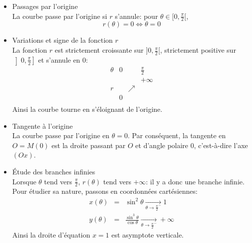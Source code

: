 {\begin{enumerate}
{\begin{itemize}
On se restreint donc dans la suite à $\theta\in[0,\frac{\pi}{2}[$, puis on obtient la courbe 
complète par réflexion d'axe $(Ox)$.
\item Passages par l'origine\\
La courbe passe par l'origine si $r$ s'annule: pour $\theta\in[0,\frac{\pi}{2}[$,
$$r(\theta)=0\Longleftrightarrow\theta=0$$
\item Variations et signe de la fonction $r$\\
La fonction $r$ est strictement croissante sur $]0,\frac{\pi}{2}[$, 
strictement positive sur $\left]0,\frac{\pi}{2}\right]$ et s'annule en $0$:
$$\begin{array}{c|lcr}
\theta&0&\ &\frac{\pi}{2}\\\hline
\ & &\ & +\infty\\
r&\ &\nearrow &\ \\
 &0 &\ & \\
\end{array}$$
Ainsi la courbe tourne en s'éloignant de l'origine.
\item Tangente à l'origine\\
La courbe passe par l'origine en $\theta=0$. Par conséquent, la tangente en $O=M\left(0\right)$ est la droite passant par $O$ et d'angle polaire $0$, c'est-à-dire l'axe $(Ox)$.
\item \'Etude des branches infinies\\
Lorsque $\theta$ tend vers $\frac{\pi}{2}$, $r(\theta)$ tend vers $+\infty$: il y a donc une branche infinie. Pour étudier sa nature, passons en coordonnées cartésiennes:
\begin{eqnarray*}
x(\theta)&=&\sin^2\theta\xrightarrow[\theta\to \frac{\pi}{2}^-]{}1\\
y(\theta)&=&\frac{\sin^3\theta}{\cos\theta}\xrightarrow[\theta\to \frac{\pi}{2}^-]{}+\infty
\end{eqnarray*}
Ainsi la droite d'équation $x=1$ est asymptote verticale. 
\end{itemize}


\begin{center}
\end{center}}
\end{enumerate}}
